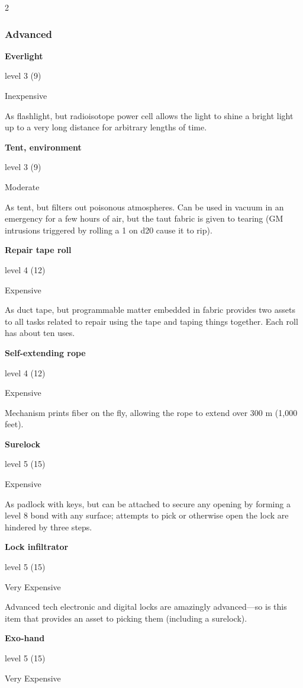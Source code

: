 \begin{multicols}{2}
\subsubsection{Advanced}

\textbf{Everlight} 

level 3 (9) 

Inexpensive 

As flashlight, but radioisotope power cell allows the light to shine a bright light up to a very long distance for arbitrary lengths of time. 

\textbf{Tent, environment} 

level 3 (9) 

Moderate 

As tent, but filters out poisonous atmospheres. Can be used in vacuum in an emergency for a few hours of air, but the taut fabric is given to tearing (GM intrusions triggered by rolling a 1 on d20 cause it to rip). 

\textbf{Repair tape roll} 

level 4 (12) 

Expensive 

As duct tape, but programmable matter embedded in fabric provides two assets to all tasks related to repair using the tape and taping things together. Each roll has about ten uses. 

\textbf{Self-extending rope} 

level 4 (12) 

Expensive 

Mechanism prints fiber on the fly, allowing the rope to extend over 300 m (1,000 feet).

\textbf{Surelock}

level 5 (15) 

Expensive 

As padlock with keys, but can be attached to secure any opening by forming a level 8 bond with any surface; attempts to pick or otherwise open the lock are hindered by three steps. 

\textbf{Lock infiltrator} 

level 5 (15) 

Very Expensive 

Advanced tech electronic and digital locks are amazingly advanced—so is this item that provides an asset to picking them (including a surelock). 

\textbf{Exo-hand} 

level 5 (15) 

Very Expensive 


\end{multicols}
